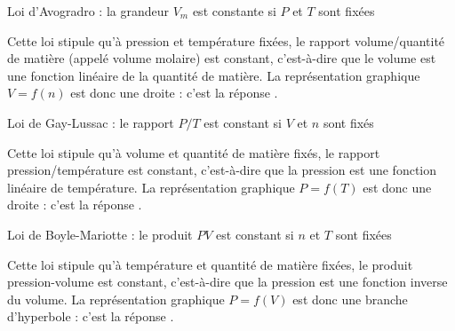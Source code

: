 


\begin{enonce}
Loi d'Avogradro : la grandeur $V_m$ est constante si $P$ et $T$ sont fixées
\end{enonce}

\reponse{\reponseC}

\begin{corrige}
Cette loi stipule qu'à pression et température fixées, le rapport volume/quantité de matière (appelé volume molaire) est constant, c'est-à-dire que le volume est une fonction linéaire de la quantité de matière. La représentation graphique $V=f(n)$ est donc une droite : c'est la réponse \reponseC{}. 
\end{corrige}




\begin{enonce}
Loi de Gay-Lussac : le rapport $P/T$ est constant si $V$ et $n$ sont fixés
\end{enonce}

\reponse{\reponseD}

\begin{corrigeNewpage}
Cette loi stipule qu'à volume et quantité de matière fixés, le rapport pression/température est constant, c'est-à-dire que la pression est une fonction linéaire de température. La représentation graphique $P=f(T)$ est donc une droite : c'est la réponse \reponseD{}.  
\end{corrigeNewpage}




\begin{enonce}
Loi de Boyle-Mariotte : le produit $PV$ est constant si $n$ et $T$ sont fixées
\end{enonce}

\reponse{\reponseA}

\begin{corrige}
Cette loi stipule qu'à température et quantité de matière fixées, le produit pression-volume est constant, c'est-à-dire que la pression est une fonction inverse du volume. La représentation graphique $P=f(V)$ est donc une branche d'hyperbole : c'est la réponse \reponseA{}. 
\end{corrige}

